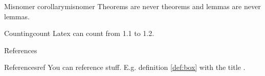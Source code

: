 \begin{multicols*}{3}
  \begin{theorem}{Misnomer corollary}{misnomer}
    Theorems are never theorems and lemmas are never lemmas.
  \end{theorem}


  \begin{axiom}{Counting}{count}
    Latex can count from 1.1 to 1.2.
  \end{axiom}

  \h{References}

  \begin{corollary}{References}{ref}
    You can reference stuff. E.g. definition \ref{def:box} with the title .
  \end{corollary}

\end{multicols*}


